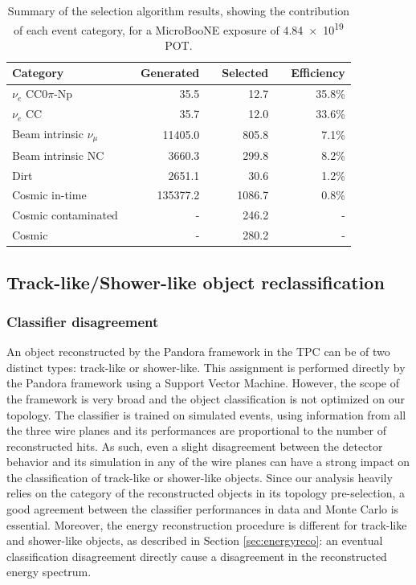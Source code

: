 \begin{table}[htbp]
   \centering
   \begin{tabular}{llrrrrr}
     \toprule
     Category & \phantom{a} & Generated & \phantom{a} & Selected & \phantom{a} & Efficiency \\
     \midrule

     $\nu_{e}$ CC0$\pi$-Np       & & 35.5     & & 12.7   & & 35.8\%\\
     $\nu_{e}$ CC                & & 35.7     & & 12.0   & & 33.6\%\\
     Beam intrinsic $\nu_{\mu}$  & & 11405.0  & & 805.8  & & 7.1\%\\
     Beam intrinsic NC           & & 3660.3   & & 299.8  & & 8.2\%\\
     Dirt                        & & 2651.1   & & 30.6   & & 1.2\%\\
     Cosmic in-time              & & 135377.2 & & 1086.7 & & 0.8\%\\
     Cosmic contaminated         & & -        & & 246.2  & & -\\
     Cosmic                      & & -        & & 280.2  & & -\\

     \bottomrule
   \end{tabular}
   \caption{Summary of the selection algorithm results, showing the contribution of each event category, for a MicroBooNE exposure of \num{4.84e19} POT.}\label{tab:result}
\end{table}

\subsection{Track-like/Shower-like object reclassification}
\subsubsection{Classifier disagreement}
An object reconstructed by the Pandora framework in the TPC can be of two distinct types: track-like or shower-like. This assignment is performed directly by the Pandora framework using a Support Vector Machine. However, the scope of the framework is very broad and the object classification is not optimized on our topology. 
The classifier is trained on simulated events, using information from all the three wire planes and its performances are proportional to the number of reconstructed hits. As such, even a slight disagreement between the detector behavior and its simulation in any of the wire planes can have a strong impact on the classification of track-like or shower-like objects. 
Since our analysis heavily relies on the category of the reconstructed objects in its topology pre-selection, a good agreement between the classifier performances in data and Monte Carlo is essential.
Moreover, the energy reconstruction procedure is different for track-like and shower-like objects, as described in Section \ref{sec:energyreco}: an eventual classification disagreement directly cause a disagreement in the reconstructed energy spectrum.

